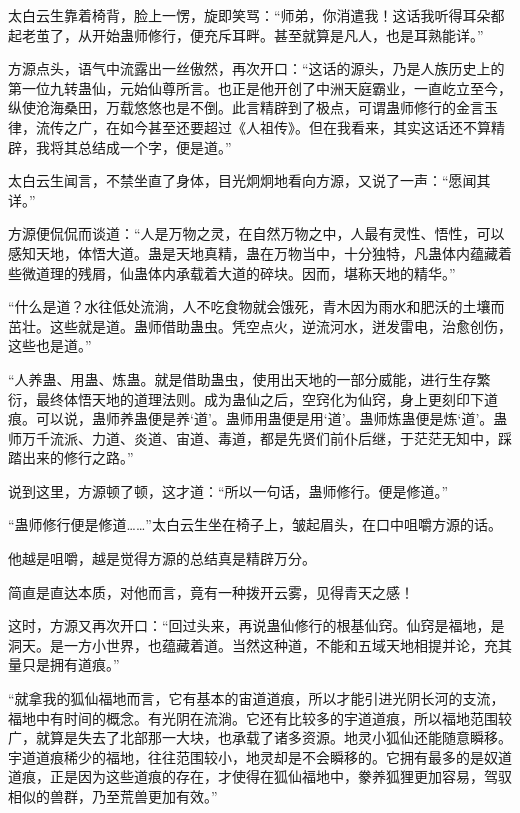 
\begin{this_body}



太白云生靠着椅背，脸上一愣，旋即笑骂：“师弟，你消遣我！这话我听得耳朵都起老茧了，从开始蛊师修行，便充斥耳畔。甚至就算是凡人，也是耳熟能详。”

方源点头，语气中流露出一丝傲然，再次开口：“这话的源头，乃是人族历史上的第一位九转蛊仙，元始仙尊所言。也正是他开创了中洲天庭霸业，一直屹立至今，纵使沧海桑田，万载悠悠也是不倒。此言精辟到了极点，可谓蛊师修行的金言玉律，流传之广，在如今甚至还要超过《人祖传》。但在我看来，其实这话还不算精辟，我将其总结成一个字，便是道。”

太白云生闻言，不禁坐直了身体，目光炯炯地看向方源，又说了一声：“愿闻其详。”

方源便侃侃而谈道：“人是万物之灵，在自然万物之中，人最有灵性、悟性，可以感知天地，体悟大道。蛊是天地真精，蛊在万物当中，十分独特，凡蛊体内蕴藏着些微道理的残屑，仙蛊体内承载着大道的碎块。因而，堪称天地的精华。”

“什么是道？水往低处流淌，人不吃食物就会饿死，青木因为雨水和肥沃的土壤而茁壮。这些就是道。蛊师借助蛊虫。凭空点火，逆流河水，迸发雷电，治愈创伤，这些也是道。”

“人养蛊、用蛊、炼蛊。就是借助蛊虫，使用出天地的一部分威能，进行生存繁衍，最终体悟天地的道理法则。成为蛊仙之后，空窍化为仙窍，身上更刻印下道痕。可以说，蛊师养蛊便是养‘道’。蛊师用蛊便是用‘道’。蛊师炼蛊便是炼‘道’。蛊师万千流派、力道、炎道、宙道、毒道，都是先贤们前仆后继，于茫茫无知中，踩踏出来的修行之路。”

说到这里，方源顿了顿，这才道：“所以一句话，蛊师修行。便是修道。”

“蛊师修行便是修道……”太白云生坐在椅子上，皱起眉头，在口中咀嚼方源的话。

他越是咀嚼，越是觉得方源的总结真是精辟万分。

简直是直达本质，对他而言，竟有一种拨开云雾，见得青天之感！

这时，方源又再次开口：“回过头来，再说蛊仙修行的根基仙窍。仙窍是福地，是洞天。是一方小世界，也蕴藏着道。当然这种道，不能和五域天地相提并论，充其量只是拥有道痕。”

“就拿我的狐仙福地而言，它有基本的宙道道痕，所以才能引进光阴长河的支流，福地中有时间的概念。有光阴在流淌。它还有比较多的宇道道痕，所以福地范围较广，就算是失去了北部那一大块，也承载了诸多资源。地灵小狐仙还能随意瞬移。宇道道痕稀少的福地，往往范围较小，地灵却是不会瞬移的。它拥有最多的是奴道道痕，正是因为这些道痕的存在，才使得在狐仙福地中，豢养狐狸更加容易，驾驭相似的兽群，乃至荒兽更加有效。”


\end{this_body}
